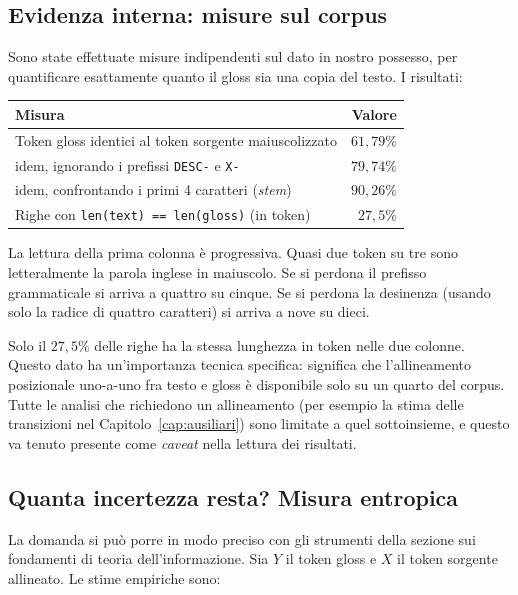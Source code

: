 \subsection{Evidenza interna: misure sul corpus}

Sono state effettuate misure indipendenti sul dato in nostro possesso, per
quantificare esattamente quanto il gloss sia una copia del testo. I risultati:

\begin{center}
\begin{tabular}{lr}
\toprule
Misura & Valore \\
\midrule
Token gloss identici al token sorgente maiuscolizzato & $61{,}79\%$ \\
\quad idem, ignorando i prefissi \texttt{DESC-} e \texttt{X-} & $79{,}74\%$ \\
\quad idem, confrontando i primi 4 caratteri (\emph{stem}) & $90{,}26\%$ \\
Righe con \texttt{len(text) == len(gloss)} (in token) & $27{,}5\%$ \\
\bottomrule
\end{tabular}
\end{center}

La lettura della prima colonna è progressiva. Quasi due token su tre sono
letteralmente la parola inglese in maiuscolo. Se si perdona il prefisso
grammaticale si arriva a quattro su cinque. Se si perdona la desinenza (usando
solo la radice di quattro caratteri) si arriva a nove su dieci.

Solo il $27{,}5\%$ delle righe ha la stessa lunghezza in token nelle due
colonne. Questo dato ha un'importanza tecnica specifica: significa che
l'allineamento posizionale uno-a-uno fra testo e gloss è disponibile solo su un
quarto del corpus. Tutte le analisi che richiedono un allineamento (per esempio
la stima delle transizioni nel Capitolo~\ref{cap:ausiliari}) sono limitate a
quel sottoinsieme, e questo va tenuto presente come \emph{caveat} nella lettura
dei risultati.

\subsection{Quanta incertezza resta? Misura entropica}
\label{sec:entropia}

La domanda si può porre in modo preciso con gli strumenti della
sezione sui fondamenti di teoria dell'informazione. Sia $Y$ il token gloss e
$X$ il token sorgente allineato. Le stime empiriche sono:

